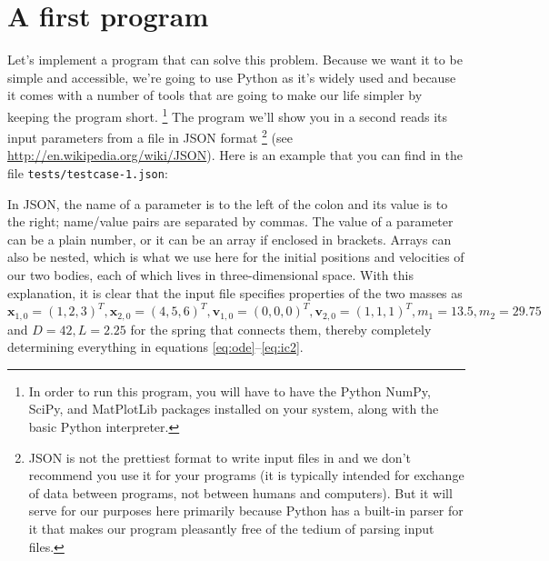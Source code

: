 \documentclass{article}
\begin{document}
\section{A first program}
\label{sec:first-steps}

Let's implement a program that can solve this problem. Because we want it
to be simple and accessible, we're going to use Python as it's widely used and
because it comes with a number of tools that are going to make our life
simpler by keeping the program short.%
\footnote{In order to run this program, you will have to have the Python
  NumPy, SciPy, and MatPlotLib packages installed on your system, along with
  the basic Python interpreter.}
The program we'll show you in a second reads its input parameters from a file in JSON format%
\footnote{JSON is not the prettiest format to write input files in and we
  don't recommend you use it for your programs (it is typically intended for
  exchange of data between programs, not between humans and computers). But it
  will serve for our purposes here primarily because Python has a built-in
  parser for it that makes our program pleasantly free of the tedium of
  parsing input files.} (see
\url{http://en.wikipedia.org/wiki/JSON}).
Here is an example that you can find in the file \texttt{tests/testcase-1.json}:

In JSON, the name of a parameter is to the left of the colon and its value is
to the right; name/value pairs are separated by commas. The value of a
parameter can be a plain number, or it can be an array if enclosed in
brackets. Arrays can also be nested, which is what we use here for the initial
positions and velocities of our two bodies, each of which lives in
three-dimensional space. With this explanation, it is clear that the input file
specifies properties of the two masses as $\mathbf x_{1,0}=(1,2,3)^T, \mathbf
x_{2,0}=(4,5,6)^T, \mathbf v_{1,0}=(0,0,0)^T, \mathbf v_{2,0}=(1,1,1)^T,
m_1=13.5, m_2=29.75$ and $D=42, L=2.25$ for the spring that connects them, 
thereby completely determining everything in equations
\eqref{eq:ode}--\eqref{eq:ic2}.
\end{document}
